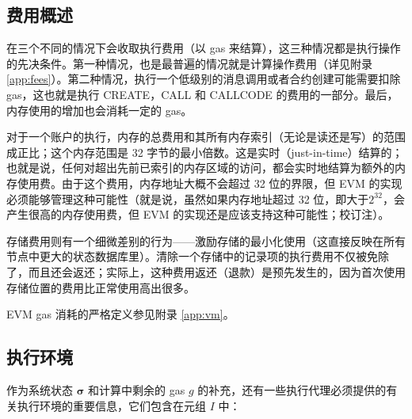 \documentclass[9pt,oneside]{amsart}
\begin{document}
\begin{multicols}{2}
\subsection{费用概述}

在三个不同的情况下会收取执行费用（以 gas 来结算），这三种情况都是执行操作的先决条件。第一种情况，也是最普遍的情况就是计算操作费用（详见附录 \ref{app:fees}）。第二种情况，执行一个低级别的消息调用或者合约创建可能需要扣除 gas，这也就是执行 {\small CREATE}，{\small CALL} 和 {\small CALLCODE} 的费用的一部分。最后，内存使用的增加也会消耗一定的 gas。

对于一个账户的执行，内存的总费用和其所有内存索引（无论是读还是写）的范围成正比；这个内存范围是 32 字节的最小倍数。这是实时（just-in-time）结算的；也就是说，任何对超出先前已索引的内存区域的访问，都会实时地结算为额外的内存使用费。由于这个费用，内存地址大概不会超过 32 位的界限，但 EVM 的实现必须能够管理这种可能性（就是说，虽然如果内存地址超过 32 位，即大于$2^{32}$，会产生很高的内存使用费，但 EVM 的实现还是应该支持这种可能性；校订注）。

存储费用则有一个细微差别的行为——激励存储的最小化使用（这直接反映在所有节点中更大的状态数据库里）。清除一个存储中的记录项的执行费用不仅被免除了，而且还会返还；实际上，这种费用返还（退款）是预先发生的，因为首次使用存储位置的费用比正常使用高出很多。

EVM gas 消耗的严格定义参见附录 \ref{app:vm}。

\subsection{执行环境}

作为系统状态 $\boldsymbol{\sigma}$ 和计算中剩余的 gas $g$ 的补充，还有一些执行代理必须提供的有关执行环境的重要信息，它们包含在元组 $I$ 中：


\end{multicols}
\end{document}
